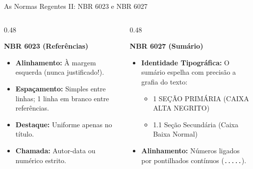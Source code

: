 \documentclass[aspectratio=169, 10pt]{beamer}
\begin{document}
\begin{frame}{As Normas Regentes II: NBR 6023 e NBR 6027}
  \begin{columns}[T]
    \begin{column}{0.48\textwidth}
      \begin{block}{\textbf{NBR 6023 (Referências)}}
        \scriptsize
        \begin{itemize}\setlength{\itemsep}{1.5pt}
          \item \textbf{Alinhamento:} À margem esquerda (nunca justificado!).
          \item \textbf{Espaçamento:} Simples entre linhas; 1 linha em branco entre referências.
          \item \textbf{Destaque:} Uniforme apenas no título.
          \item \textbf{Chamada:} Autor-data ou numérico estrito.
        \end{itemize}
      \end{block}
    \end{column}

    \begin{column}{0.48\textwidth}
      \begin{block}{\textbf{NBR 6027 (Sumário)}}
        \scriptsize
        \begin{itemize}\setlength{\itemsep}{1.5pt}
          \item \textbf{Identidade Tipográfica:} O sumário espelha com precisão a grafia do texto:
            \begin{itemize}\setlength{\itemsep}{1pt}
              \item 1 SEÇÃO PRIMÁRIA (CAIXA ALTA NEGRITO)
              \item 1.1 Seção Secundária (Caixa Baixa Normal)
            \end{itemize}
          \item \textbf{Alinhamento:} Números ligados por pontilhados contínuos (\texttt{.....}).
        \end{itemize}
      \end{block}
    \end{column}
  \end{columns}
\end{frame}
\end{document}
